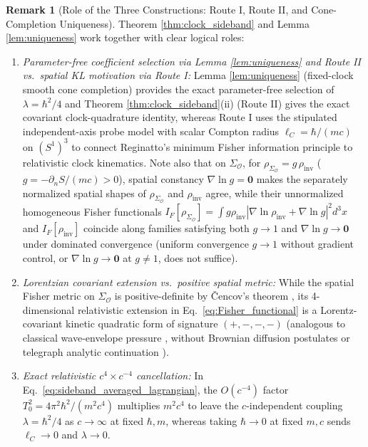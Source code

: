 \documentclass[11pt, a4paper]{article}
\theoremstyle{definition}
\newtheorem{remark}[theorem]{Remark}
\begin{document}
\begin{remark}[Role of the Three Constructions: Route I, Route II, and Cone-Completion Uniqueness]
\label{rem:clock_unification_vs_stochastic}
Theorem \ref{thm:clock_sideband} and Lemma \ref{lem:uniqueness} work together with clear logical roles:
\begin{enumerate}[label=(\alph*), nosep]
    \item \textit{Parameter-free coefficient selection via Lemma \ref{lem:uniqueness} and Route II vs.\ spatial KL motivation via Route I:} Lemma \ref{lem:uniqueness} (fixed-clock smooth cone completion) provides the exact parameter-free selection of $\lambda = \hbar^2/4$ and Theorem \ref{thm:clock_sideband}(ii) (Route II) gives the exact covariant clock-quadrature identity, whereas Route I uses the stipulated independent-axis probe model with scalar Compton radius $\ell_C = \hbar/(mc)$ on $(S^1)^3$ to connect Reginatto's minimum Fisher information principle \cite{Reginatto1998, Reginatto1999} to relativistic clock kinematics. Note also that on $\Sigma_{\mathcal{O}}$, for $\rho_{\Sigma_{\mathcal{O}}} = g\,\rho_{\text{inv}}$ ($g = -\partial_n S / (mc) > 0$), spatial constancy $\nabla\ln g = \mathbf{0}$ makes the separately normalized spatial shapes of $\rho_{\Sigma_{\mathcal{O}}}$ and $\rho_{\text{inv}}$ agree, while their unnormalized homogeneous Fisher functionals $I_F[\rho_{\Sigma_{\mathcal{O}}}] = \int g\rho_{\text{inv}}|\nabla\ln\rho_{\text{inv}} + \nabla\ln g|^2 d^3x$ and $I_F[\rho_{\text{inv}}]$ coincide along families satisfying both $g \to 1$ and $\nabla\ln g \to \mathbf{0}$ under dominated convergence (uniform convergence $g \to 1$ without gradient control, or $\nabla\ln g \to \mathbf{0}$ at $g \neq 1$, does not suffice).
    \item \textit{Lorentzian covariant extension vs.\ positive spatial metric:} While the spatial Fisher metric on $\Sigma_{\mathcal{O}}$ is positive-definite by \v{C}encov's theorem \cite{Cencov1982}, its 4-dimensional relativistic extension in Eq.~\eqref{eq:Fisher_functional} is a Lorentz-covariant kinetic quadratic form of signature $(+,-,-,-)$ (analogous to classical wave-envelope pressure \cite{Hui2017}, without Brownian diffusion postulates \cite{Nelson1966, Nelson2012, Derakhshani2018} or telegraph analytic continuation \cite{Gaveau1984}).
    \item \textit{Exact relativistic $c^4 \times c^{-4}$ cancellation:} In Eq.~\eqref{eq:sideband_averaged_lagrangian}, the $O(c^{-4})$ factor $T_0^2 = 4\pi^2\hbar^2/(m^2 c^4)$ multiplies $m^2 c^4$ to leave the $c$-independent coupling $\lambda = \hbar^2/4$ as $c \to \infty$ at fixed $\hbar, m$, whereas taking $\hbar \to 0$ at fixed $m, c$ sends $\ell_C \to 0$ and $\lambda \to 0$.
\end{enumerate}
\end{remark}
\end{document}
